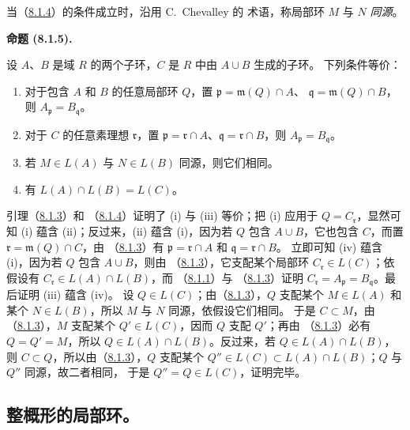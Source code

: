 \documentclass[UTF8,fontset=none,11pt,oneside,openany]{ctexbook}
\newenvironment{proposition}[1][]{%
  \par\medskip\noindent\textbf{命题 (#1).}\ %
}{\par}
\let\EGAOriginalLabel\label
\renewcommand{\label}[1]{\phantomsection\EGAOriginalLabel{#1}}
\begin{document}
当（\hyperref[I.8.1.4-fr]{8.1.4}）的条件成立时，沿用 C.~Chevalley 的
术语，称局部环 $M$ 与 $N$ \emph{同源}。

\begin{proposition}[8.1.5]
\label{I.8.1.5-fr}
设 $A$、$B$ 是域 $R$ 的两个子环，$C$ 是 $R$ 中由 $A\cup B$ 生成的子环。
下列条件等价：
\begin{enumerate}
  \item[(i)] 对于包含 $A$ 和 $B$ 的任意局部环 $Q$，置
    $\mathfrak p=\mathfrak m(Q)\cap A$、
    $\mathfrak q=\mathfrak m(Q)\cap B$，则
    $A_\mathfrak p=B_\mathfrak q$。
  \item[(ii)] 对于 $C$ 的任意素理想 $\mathfrak r$，置
    $\mathfrak p=\mathfrak r\cap A$、$\mathfrak q=\mathfrak r\cap B$，则
    $A_\mathfrak p=B_\mathfrak q$。
  \item[(iii)] 若 $M\in L(A)$ 与 $N\in L(B)$ 同源，则它们相同。
  \item[(iv)] 有 $L(A)\cap L(B)=L(C)$。
\end{enumerate}
\end{proposition}

引理（\hyperref[I.8.1.3-fr]{8.1.3}）和
（\hyperref[I.8.1.4-fr]{8.1.4}）证明了 (i) 与 (iii) 等价；把 (i) 应用于
$Q=C_\mathfrak r$，显然可知 (i) 蕴含 (ii)；反过来，(ii) 蕴含 (i)，因为若
$Q$ 包含 $A\cup B$，它也包含 $C$，而置
$\mathfrak r=\mathfrak m(Q)\cap C$，由
（\hyperref[I.8.1.3-fr]{8.1.3}）有
$\mathfrak p=\mathfrak r\cap A$ 和 $\mathfrak q=\mathfrak r\cap B$。
立即可知 (iv) 蕴含 (i)，因为若 $Q$ 包含 $A\cup B$，则由
（\hyperref[I.8.1.3-fr]{8.1.3}），它支配某个局部环
$C_\mathfrak r\in L(C)$；依假设有
$C_\mathfrak r\in L(A)\cap L(B)$，而
（\hyperref[I.8.1.1-fr]{8.1.1}）与
（\hyperref[I.8.1.3-fr]{8.1.3}）证明
$C_\mathfrak r=A_\mathfrak p=B_\mathfrak q$。最后证明 (iii) 蕴含 (iv)。
设 $Q\in L(C)$；由（\hyperref[I.8.1.3-fr]{8.1.3}），$Q$ 支配某个
$M\in L(A)$ 和某个 $N\in L(B)$，所以 $M$ 与 $N$ 同源，依假设它们相同。
于是 $C\subset M$，由（\hyperref[I.8.1.3-fr]{8.1.3}），$M$ 支配某个
$Q'\in L(C)$，因而 $Q$ 支配 $Q'$；再由
（\hyperref[I.8.1.3-fr]{8.1.3}）必有 $Q=Q'=M$，所以
$Q\in L(A)\cap L(B)$。反过来，若 $Q\in L(A)\cap L(B)$，则
$C\subset Q$，所以由（\hyperref[I.8.1.3-fr]{8.1.3}），$Q$ 支配某个
$Q''\in L(C)\subset L(A)\cap L(B)$；$Q$ 与 $Q''$ 同源，故二者相同，
于是 $Q''=Q\in L(C)$，证明完毕。

\subsection{整概形的局部环。}
\label{subsection:I.8.2-fr}
\end{document}
